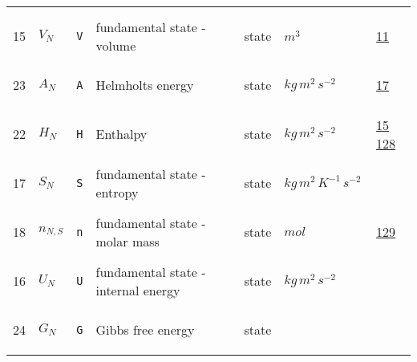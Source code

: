 \begin{longtable}{|p{1cm}|p{2.5cm}|p{4.5cm}|p{8cm}|p{3.0cm}|p{3cm}|p{1cm}|}
             & \\
            15
             & \hypertarget{"v:15"}{ $ {V}{_{N}} $}
             & \verb|V|
             & fundamental state - volume
             & \begin{lay}state \end{lay}
             & $ m^{3} \, $
             &                 \hyperlink{"e:11"}{ 11 }
                 \\
            23
             & \hypertarget{"v:23"}{ $ {A}{_{N}} $}
             & \verb|A|
             & Helmholts energy
             & \begin{lay}state \end{lay}
             & $ kg \,m^{2} \,s^{-2} \, $
             &                 \hyperlink{"e:17"}{ 17 }
                 \\
            22
             & \hypertarget{"v:22"}{ $ {H}{_{N}} $}
             & \verb|H|
             & Enthalpy
             & \begin{lay}state \end{lay}
             & $ kg \,m^{2} \,s^{-2} \, $
             &                 \hyperlink{"e:15"}{ 15 }
                                 \hyperlink{"e:128"}{ 128 }
                 \\
            17
             & \hypertarget{"v:17"}{ $ {S}{_{N}} $}
             & \verb|S|
             & fundamental state - entropy
             & \begin{lay}state \end{lay}
             & $ kg \,m^{2} \,K^{-1} \,s^{-2} \, $
             & \\
            18
             & \hypertarget{"v:18"}{ $ {n}{_{N, S}} $}
             & \verb|n|
             & fundamental state - molar mass
             & \begin{lay}state \end{lay}
             & $ mol \, $
             &                 \hyperlink{"e:129"}{ 129 }
                 \\
            16
             & \hypertarget{"v:16"}{ $ {U}{_{N}} $}
             & \verb|U|
             & fundamental state - internal energy
             & \begin{lay}state \end{lay}
             & $ kg \,m^{2} \,s^{-2} \, $
             & \\
            24
             & \hypertarget{"v:24"}{ $ {G}{_{N}} $}
             & \verb|G|
             & Gibbs free energy
             & \begin{lay}state \end{lay}

\end{longtable}
